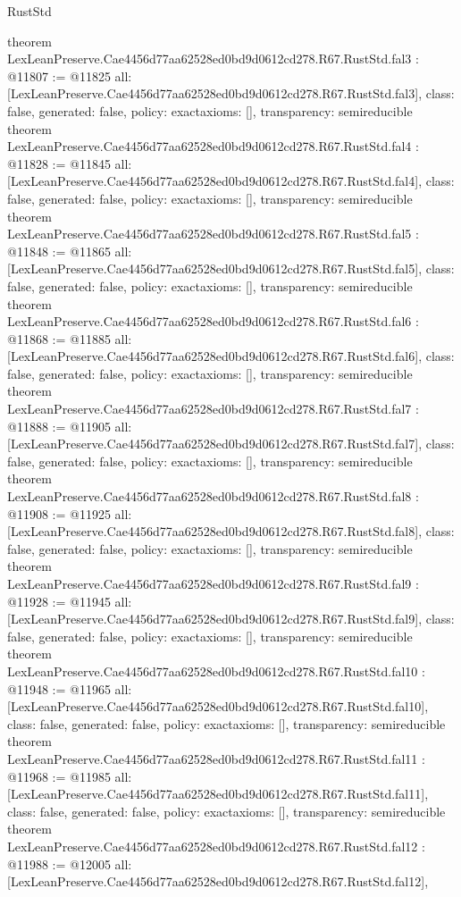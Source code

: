 \begin{lexlean}{RustStd}
\begin{coremodule}
{}
theorem LexLeanPreserve.Cae4456d77aa62528ed0bd9d0612cd278.R67.RustStd.fal3 : @11807 := @11825 {
  all: [LexLeanPreserve.Cae4456d77aa62528ed0bd9d0612cd278.R67.RustStd.fal3],
  class: false,
  generated: false,
  policy: exact{axioms: []},
  transparency: semireducible
}
theorem LexLeanPreserve.Cae4456d77aa62528ed0bd9d0612cd278.R67.RustStd.fal4 : @11828 := @11845 {
  all: [LexLeanPreserve.Cae4456d77aa62528ed0bd9d0612cd278.R67.RustStd.fal4],
  class: false,
  generated: false,
  policy: exact{axioms: []},
  transparency: semireducible
}
theorem LexLeanPreserve.Cae4456d77aa62528ed0bd9d0612cd278.R67.RustStd.fal5 : @11848 := @11865 {
  all: [LexLeanPreserve.Cae4456d77aa62528ed0bd9d0612cd278.R67.RustStd.fal5],
  class: false,
  generated: false,
  policy: exact{axioms: []},
  transparency: semireducible
}
theorem LexLeanPreserve.Cae4456d77aa62528ed0bd9d0612cd278.R67.RustStd.fal6 : @11868 := @11885 {
  all: [LexLeanPreserve.Cae4456d77aa62528ed0bd9d0612cd278.R67.RustStd.fal6],
  class: false,
  generated: false,
  policy: exact{axioms: []},
  transparency: semireducible
}
theorem LexLeanPreserve.Cae4456d77aa62528ed0bd9d0612cd278.R67.RustStd.fal7 : @11888 := @11905 {
  all: [LexLeanPreserve.Cae4456d77aa62528ed0bd9d0612cd278.R67.RustStd.fal7],
  class: false,
  generated: false,
  policy: exact{axioms: []},
  transparency: semireducible
}
theorem LexLeanPreserve.Cae4456d77aa62528ed0bd9d0612cd278.R67.RustStd.fal8 : @11908 := @11925 {
  all: [LexLeanPreserve.Cae4456d77aa62528ed0bd9d0612cd278.R67.RustStd.fal8],
  class: false,
  generated: false,
  policy: exact{axioms: []},
  transparency: semireducible
}
theorem LexLeanPreserve.Cae4456d77aa62528ed0bd9d0612cd278.R67.RustStd.fal9 : @11928 := @11945 {
  all: [LexLeanPreserve.Cae4456d77aa62528ed0bd9d0612cd278.R67.RustStd.fal9],
  class: false,
  generated: false,
  policy: exact{axioms: []},
  transparency: semireducible
}
theorem LexLeanPreserve.Cae4456d77aa62528ed0bd9d0612cd278.R67.RustStd.fal10 : @11948 := @11965 {
  all: [LexLeanPreserve.Cae4456d77aa62528ed0bd9d0612cd278.R67.RustStd.fal10],
  class: false,
  generated: false,
  policy: exact{axioms: []},
  transparency: semireducible
}
theorem LexLeanPreserve.Cae4456d77aa62528ed0bd9d0612cd278.R67.RustStd.fal11 : @11968 := @11985 {
  all: [LexLeanPreserve.Cae4456d77aa62528ed0bd9d0612cd278.R67.RustStd.fal11],
  class: false,
  generated: false,
  policy: exact{axioms: []},
  transparency: semireducible
}
theorem LexLeanPreserve.Cae4456d77aa62528ed0bd9d0612cd278.R67.RustStd.fal12 : @11988 := @12005 {
  all: [LexLeanPreserve.Cae4456d77aa62528ed0bd9d0612cd278.R67.RustStd.fal12],
}
\end{coremodule}
\end{lexlean}
